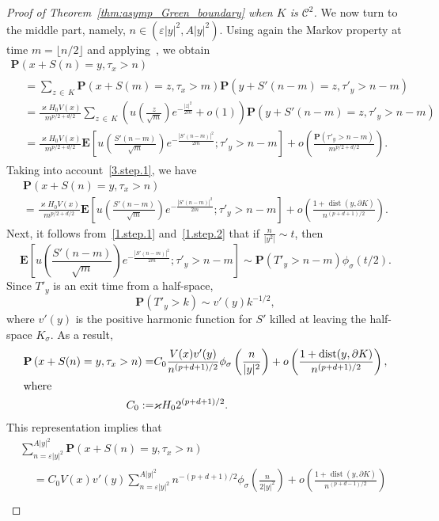 \documentclass[10pt]{amsart}
\theoremstyle{definition}\newtheorem{defi}[theo]{Definition}\newtheorem{rema}[theo]{Remark}\newtheorem{exam}[theo]{Example}\newtheorem{exem}[theo]{Example}\newtheorem{nota}[theo]{Notation}
\DeclareMathOperator{\dist}{dist}
\newcommand{\clC}{\mathcal{C}}
\newcommand{\pr}{\mathbf{P}}
\newcommand{\e}{\mathbf{E}}
\begin{document}
\begin{proof}[Proof of Theorem~\ref{thm:asymp_Green_boundary} when $K$ is $\clC^{2}$]
We now turn to the middle part, namely, $n\in(\varepsilon|y|^2,A| y|^2)$. Using again the Markov property at time $m=\lfloor n/2\rfloor$ and applying~\cite[Theorem~5]{DeWa-15}, we obtain
\begin{multline*}
\pr\left(x+S(n)=y,\tau_x>n\right)\\
\begin{aligned}
&=\sum_{z\,\in\,K}\pr\left(x+S(m)=z,\tau_x>m\right)\pr\left(y+S'(n-m)=z,\tau'_y>n-m\right)\\
&=\frac{\varkappa H_0V(x)}{m^{p/2+d/2}}
\sum_{z\,\in\,K}\left(u\left(\frac{z}{\sqrt{m}}\right)e^{-\frac{|z|^2}{2m}}+o(1)\right)\pr\left(y+S'(n-m)=z,\tau'_y>n-m\right)\\
&=\frac{\varkappa H_0V(x)}{m^{p/2+d/2}}
\e\left[u\left(\frac{S'(n-m)}{\sqrt{m}}\right)e^{-\frac{\left|S'(n-m)\right|^2}{2m}};\tau'_y>n-m\right] +o\left(\frac{\pr\left(\tau'_y>n-m\right)}{m^{p/2+d/2}}\right).
\end{aligned}
\end{multline*}
Taking into account~\eqref{3.step.1}, we have
\begin{multline*}
\pr\left(x+S(n)=y,\tau_x>n\right)\\
=\frac{\varkappa H_0V(x)}{m^{p/2+d/2}}
\e\left[u\left(\frac{S'(n-m)}{\sqrt{m}}\right)e^{-\frac{\left|S'(n-m)\right|^2}{2m}};\tau'_y>n-m\right] +o\left(\frac{1+\dist(y,\partial K)}{n^{(p+d+1)/2}}\right).
\end{multline*}
Next, it follows from~\eqref{1.step.1} and~\eqref{1.step.2} that if $\frac{n}{| y^2|}\sim t$, then
\[
\e\left[u\left(\frac{S'(n-m)}{\sqrt{m}}\right)e^{-\frac{\left|S'(n-m)\right|^2}{2m}};\tau'_y>n-m\right]
\sim \pr\left(T'_y>n-m\right) \phi_\sigma(t/2).
\]
Since $T'_y$ is an exit time from a half-space,
\[
\pr\left(T'_y>k\right)\sim v'(y)k^{-1/2},
\]
where $v'(y)$ is the positive harmonic function for $S'$ killed at leaving the half-space $K_{\sigma}$. As a result,
\begin{align*}
\pr\left(x+S(n)=y,\tau_x>n\right) =& C_0 \frac{V(x)v'(y)}{n^{(p+d+1)/2}}\phi_\sigma\left(\frac{n}{|y|^2}\right) +o\left(\frac{1+\dist(y, \partial K)}{n^{(p+d+1)/2}}\right),
\\
\intertext{where}
C_0:=& \varkappa H_0 2^{(p+d+1)/2}.
\end{align*}
This representation implies that
\begin{multline*}
\sum_{n=\varepsilon|y|^2}^{A| y|^2}\pr(x+S(n)=y,\tau_x>n)\\
\begin{aligned}
&= C_0V(x)v'(y)\sum_{n=\varepsilon|y|^2}^{A|y|^2}n^{-(p+d+1)/2}\phi_\sigma\left(\frac{n}{2|y|^2}\right) +o\left(\frac{1+\dist(y, \partial K)}{n^{(p+d-1)/2}}\right)\\

\end{aligned}
\end{multline*}
\end{proof}
\end{document}
